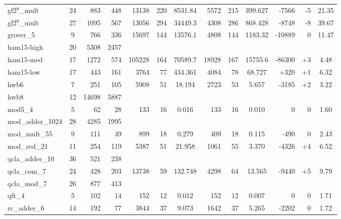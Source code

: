 \begin{table}[H]
\begin{tabular}{l|c rr|rr S[table-format=5.3]|rr S[table-format=5.3]|rr S[table-format=2.2]}
gf2$^{8}$\_mult      & 24 & 883  & 448  &       13138 &     220&         8531.84 &     5572  &   215&         399.627  & -7566 & -5 & 21.35 \\
gf2$^{9}$\_mult      & 27 & 1095 & 567  &       13056&    294 &          34449.3 &     4308 &    286 &          868.428 & -8748 & -8 & 39.67 \\
grover\_5            & 9  & 766  & 336  & 15697 & 144 & 13576.1  & 4808  & 144 & 1183.32  & -10889 & 0    & 11.47 \\
ham15-high           & 20 & 5308 & 2457 &       &     &          &       &     &          &        &      &       \\
ham15-med            & 17 & 1272 & 574  &     105228  &     164&          70589.7&     18928  &    167 &         15755.6  & -86300 & +3 & 4.48 \\
ham15-low            & 17 & 443  & 161  & 3764  & 77  & 434.361  & 4084  & 78  & 68.727   & +320   & +1   & 6.32  \\
hwb6                 & 7  & 251  & 105  & 5908  & 51  & 18.194   & 2723  & 53  & 5.657    & -3185  & +2   & 3.22  \\
hwb8                 & 12 & 14698 & 5887 &       &     &          &       &     &          &        &      &       \\
mod5\_4              & 5  & 62   & 28   & 133   & 16  & 0.016    & 133   & 16  & 0.010    & 0      & 0    & 1.60  \\
mod\_adder\_1024     & 28 & 4285 & 1995 &       &     &          &       &     &          &        &      &       \\
mod\_mult\_55        & 9  & 111  & 49   & 899   & 18  & 0.279    & 409   & 18  & 0.115    & -490   & 0    & 2.43  \\
mod\_red\_21         & 11 & 254  & 119  & 5387  & 51  & 21.958   & 1061  & 55  & 3.370    & -4326  & +4   & 6.52  \\
qcla\_adder\_10      & 36 & 521  & 238  &       &     &          &       &     &          &        &      &       \\
qcla\_com\_7         & 24 & 428  & 203  & 13738 & 59  & 132.748  & 4298  & 64  & 13.565   & -9440  & +5   & 9.79  \\
qcla\_mod\_7         & 26 & 877  & 413  &       &     &          &       &     &          &        &      &       \\
qft\_4               & 5  & 102  & 14   & 152   & 12  & 0.012    & 152   & 12  & 0.007    & 0      & 0    & 1.71  \\
rc\_adder\_6         & 14 & 192  & 77   & 3844  & 37  & 9.073    & 1642  & 37  & 5.265    & -2202  & 0    & 1.72  \\

\end{tabular}
\end{table}
